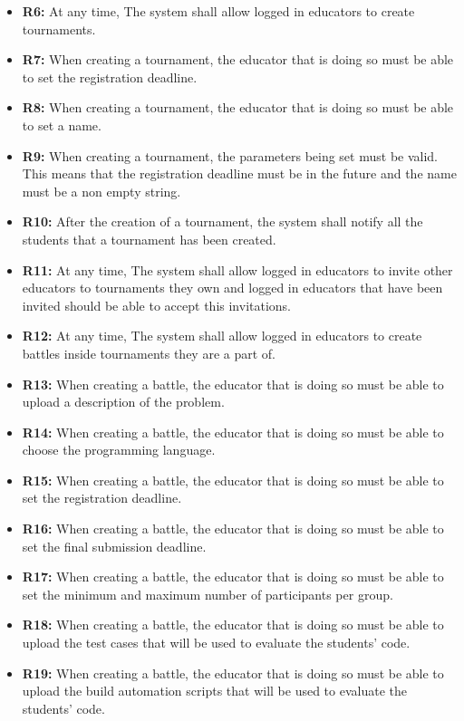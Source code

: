 \documentclass{article}
\begin{document}
\begin{itemize}
    \item \textbf{R6:} At any time, The system shall allow logged in educators to create tournaments.
    \item \textbf{R7:} When creating a tournament, the educator that is doing so must be able to set the registration deadline.
    \item \textbf{R8:} When creating a tournament, the educator that is doing so must be able to set a name.
    \item \textbf{R9:} When creating a tournament, the parameters being set must be valid. This means that the registration deadline must be in the future and the name must be a non empty string.
    \item \textbf{R10:} After the creation of a tournament, the system shall notify all the students that a tournament has been created.
    \item \textbf{R11:} At any time, The system shall allow logged in educators to invite other educators to tournaments they own and logged in educators that have been invited should be able to accept this invitations.
    \item \textbf{R12:} At any time, The system shall allow logged in educators to create battles inside tournaments they are a part of.
    \item \textbf{R13:} When creating a battle, the educator that is doing so must be able to upload a description of the problem.
    \item \textbf{R14:} When creating a battle, the educator that is doing so must be able to choose the programming language.
    \item \textbf{R15:} When creating a battle, the educator that is doing so must be able to set the registration deadline.
    \item \textbf{R16:} When creating a battle, the educator that is doing so must be able to set the final submission deadline.
    \item \textbf{R17:} When creating a battle, the educator that is doing so must be able to set the minimum and maximum number of participants per group.
    \item \textbf{R18:} When creating a battle, the educator that is doing so must be able to upload the test cases that will be used to evaluate the students' code.
    \item \textbf{R19:} When creating a battle, the educator that is doing so must be able to upload the build automation scripts that will be used to evaluate the students' code.

\end{itemize}
\end{document}
